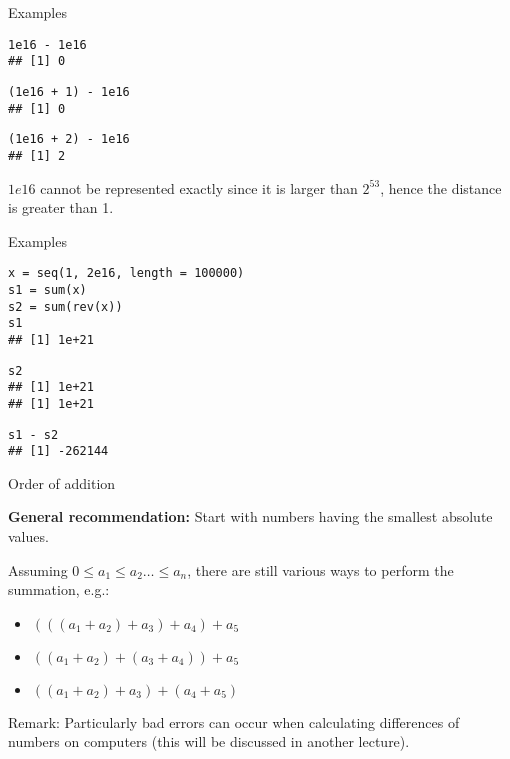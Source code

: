 \documentclass[11pt,compress,t,notes=noshow, xcolor=table]{beamer}
\begin{document}
\begin{vbframe}{Examples}
\footnotesize
\vspace{0.5cm}
\begin{verbatim}
1e16 - 1e16
## [1] 0
\end{verbatim}

\vspace{0.2cm}
\begin{verbatim}
(1e16 + 1) - 1e16
## [1] 0
\end{verbatim}

\vspace{0.2cm}
\begin{verbatim}
(1e16 + 2) - 1e16
## [1] 2
\end{verbatim}

\lz
\normalsize
$1e16$ cannot be represented exactly since it is larger than $2^{53}$, hence the distance is greater than 1.
\end{vbframe}



\begin{vbframe}{Examples}
\lz
\footnotesize
\begin{verbatim}
x = seq(1, 2e16, length = 100000)
s1 = sum(x)
s2 = sum(rev(x))
s1
## [1] 1e+21
\end{verbatim}

\vspace{0.3cm}
\begin{verbatim}
s2
## [1] 1e+21
## [1] 1e+21
\end{verbatim}

\vspace{0.3cm}
\begin{verbatim}
s1 - s2
## [1] -262144
\end{verbatim}

\end{vbframe}

\normalsize

\begin{vbframe}{Order of addition}

{\bf General recommendation:} Start with numbers having the smallest absolute values.

\lz

Assuming $0 \leq a_1 \leq a_2 \dots \leq a_n$, there are still various ways to perform the summation, e.g.:
\begin{itemize}
\item $ (( (a_1 + a_2) + a_3) + a_4) + a_5$
\item $ ((a_1 + a_2) + (a_3 + a_4) ) + a_5$
\item $ ((a_1 + a_2) + a_3) + (a_4 + a_5)$
\end{itemize}

\lz

Remark: Particularly bad errors can occur when calculating differences of numbers on computers (this will be discussed in another lecture). 

\end{vbframe}
\end{document}
